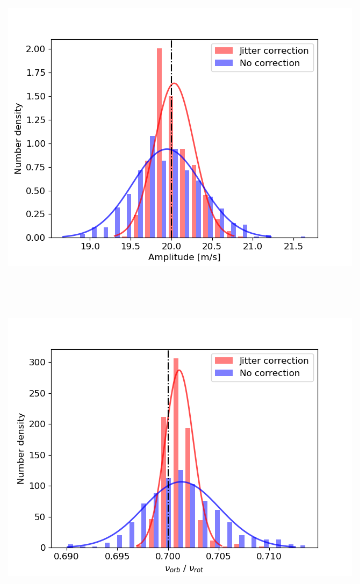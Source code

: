 \begin{figure}[htbp]	
    \begin{subfigure}[b]{0.49\textwidth}
        \includegraphics[width=\textwidth]{./Figures/Methods/Histogram_new1_p20_sn10000.png}
    \end{subfigure}
	~
    \begin{subfigure}[b]{0.49\textwidth}
        \includegraphics[width=\textwidth]{./Figures/Methods/Histogram_new2_p20_sn10000.png}
    \end{subfigure}	
    ~
    \begin{subfigure}[b]{0.49\textwidth}

\end{subfigure}
\end{figure}
